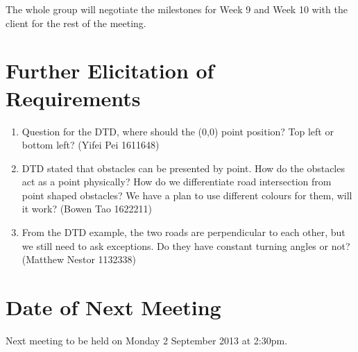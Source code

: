 \documentclass[11pt, a4paper]{article}
\begin{document}
The whole group will negotiate the milestones for Week 9 and Week 10 with the client for the rest of the meeting. 

\section{Further Elicitation of Requirements}

\begin{enumerate}

\item Question for the DTD, where should the (0,0) point position? Top left or bottom left? (Yifei Pei 1611648)

\item DTD stated that obstacles can be presented by point. How do the obstacles act
as a point physically? How do we differentiate road intersection from point shaped
obstacles? We have a plan to use different colours for them, will it work? (Bowen Tao 1622211) 

\item From the DTD example, the two roads are perpendicular to each other, but we still
need to ask exceptions. Do they have constant turning angles or not? (Matthew Nestor 1132338)  

\end{enumerate}

\section{Date of Next Meeting}
\noindent Next meeting to be held on Monday 2 September 2013 at 2:30pm.
\end{document}
